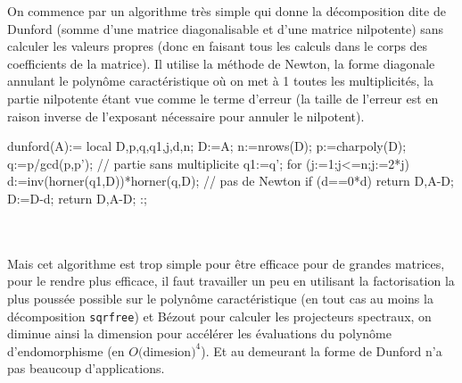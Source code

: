 \documentclass[a4paper,11pt]{article}
\begin{document}
\begin{giacjshere}
On commence par un algorithme tr\`es simple qui donne la d\'ecomposition
dite de Dunford (somme d'une matrice diagonalisable et d'une matrice
nilpotente) sans calculer les valeurs propres (donc en faisant
tous les calculs dans le corps des coefficients de la matrice).
Il utilise la m\'ethode de Newton, la forme diagonale
annulant le polyn\^ome caract\'eristique o\`u on met \`a 1 toutes
les multiplicit\'es, la partie nilpotente \'etant vue comme le
terme d'erreur (la taille de l'erreur est en raison inverse
de l'exposant n\'ecessaire pour annuler le nilpotent).
\begin{giacprog}
dunford(A):={
  local D,p,q,q1,j,d,n;
  D:=A;
  n:=nrows(D);
  p:=charpoly(D);
  q:=p/gcd(p,p'); // partie sans multiplicite
  q1:=q';
  for (j:=1;j<=n;j:=2*j){
    d:=inv(horner(q1,D))*horner(q,D); // pas de Newton
    if (d==0*d) return D,A-D;
    D:=D-d;
  }
  return D,A-D;
}:;
\end{giacprog}
\\
\\
Mais cet algorithme est trop simple pour \^etre efficace pour de
grandes matrices, pour le rendre plus efficace, il faut travailler un
peu en utilisant la factorisation la plus pouss\'ee possible sur le
polyn\^ome caract\'eristique (en tout cas au moins la d\'ecomposition
\verb|sqrfree|) et B\'ezout pour calculer les projecteurs spectraux,
on diminue ainsi la dimension pour acc\'el\'erer les \'evaluations du
polyn\^ome d'endomorphisme (en $O($dimesion$)^4$). Et au demeurant
la forme de Dunford n'a pas beaucoup d'applications.


\end{giacjshere}
\end{document}
